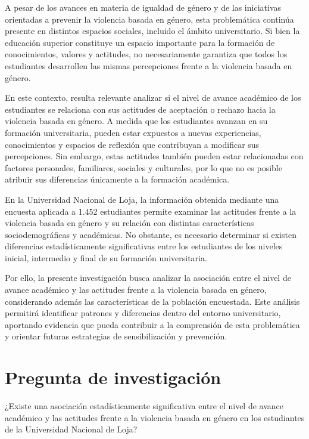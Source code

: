 \documentclass[
  spanish,
  11pt,
  letterpaper,
  DIV=11,
  numbers=noendperiod]{scrreprt}
\begin{document}
A pesar de los avances en materia de igualdad de género y de las
iniciativas orientadas a prevenir la violencia basada en género, esta
problemática continúa presente en distintos espacios sociales, incluido
el ámbito universitario. Si bien la educación superior constituye un
espacio importante para la formación de conocimientos, valores y
actitudes, no necesariamente garantiza que todos los estudiantes
desarrollen las mismas percepciones frente a la violencia basada en
género.

En este contexto, resulta relevante analizar si el nivel de avance
académico de los estudiantes se relaciona con sus actitudes de
aceptación o rechazo hacia la violencia basada en género. A medida que
los estudiantes avanzan en su formación universitaria, pueden estar
expuestos a nuevas experiencias, conocimientos y espacios de reflexión
que contribuyan a modificar sus percepciones. Sin embargo, estas
actitudes también pueden estar relacionadas con factores personales,
familiares, sociales y culturales, por lo que no es posible atribuir sus
diferencias únicamente a la formación académica.

En la Universidad Nacional de Loja, la información obtenida mediante una
encuesta aplicada a 1.452 estudiantes permite examinar las actitudes
frente a la violencia basada en género y su relación con distintas
características sociodemográficas y académicas. No obstante, es
necesario determinar si existen diferencias estadísticamente
significativas entre los estudiantes de los niveles inicial, intermedio
y final de su formación universitaria.

Por ello, la presente investigación busca analizar la asociación entre
el nivel de avance académico y las actitudes frente a la violencia
basada en género, considerando además las características de la
población encuestada. Este análisis permitirá identificar patrones y
diferencias dentro del entorno universitario, aportando evidencia que
pueda contribuir a la comprensión de esta problemática y orientar
futuras estrategias de sensibilización y prevención.

\section{Pregunta de investigación}\label{pregunta-de-investigaciuxf3n}

¿Existe una asociación estadísticamente significativa entre el nivel de
avance académico y las actitudes frente a la violencia basada en género
en los estudiantes de la Universidad Nacional de Loja?
\end{document}
